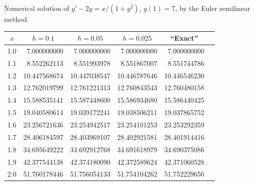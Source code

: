 \begin{examplesolution}
\begin{newtable}
  \label{table:3.1.8} Numerical solution of $y'-2y=x/(1+y^{2})$, $y(1)=7$, by the Euler semilinear
  method.
  \begin{center}
    \begin{tabular}{|c|r|r|r|r|r|}
      \hline
      \multicolumn{1}{|c|}{$x$} & \multicolumn{1}{|c|}{$h=0.1$} & \multicolumn{1}{|c|}{$h=0.05$} & \multicolumn{1}{|c|}{$h=0.025$} & \multicolumn{1}{|c|}{``Exact''} \\
      \hline
      1.0                       & 7.000000000                   & 7.000000000                    & 7.000000000                     & 7.000000000                     \\
      1.1                       & 8.552262113                   & 8.551993978                    & 8.551867007                     & 8.551744786                     \\
      1.2                       & 10.447568674                  & 10.447038547                   & 10.446787646                    & 10.446546230                    \\
      1.3                       & 12.762019799                  & 12.761221313                   & 12.760843543                    & 12.760480158                    \\
      1.4                       & 15.588535141                  & 15.587448600                   & 15.586934680                    & 15.586440425                    \\
      1.5                       & 19.040580614                  & 19.039172241                   & 19.038506211                    & 19.037865752                    \\
      1.6                       & 23.256721636                  & 23.254942517                   & 23.254101253                    & 23.253292359                    \\
      1.7                       & 28.406184597                  & 28.403969107                   & 28.402921581                    & 28.401914416                    \\
      1.8                       & 34.695649222                  & 34.692912768                   & 34.691618979                    & 34.690375086                    \\
      1.9                       & 42.377544138                  & 42.374180090                   & 42.372589624                    & 42.371060528                    \\
      2.0                       & 51.760178446                  & 51.756054133                   & 51.754104262                    & 51.752229656                    \\
      \hline
    \end{tabular}
  \end{center}
\end{newtable}
\end{examplesolution}

